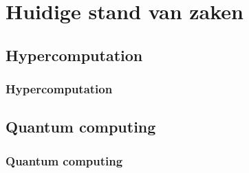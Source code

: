 \documentclass{beamer}
\begin{document}
\section{Huidige stand van zaken}
\subsection{Hypercomputation}
\begin{frame}
    \frametitle{Hypercomputation}
\end{frame}
\subsection{Quantum computing}
\begin{frame}
    \frametitle{Quantum computing}
\end{frame}
\end{document}
